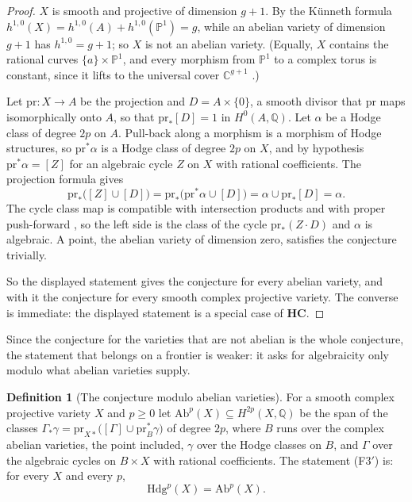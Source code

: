 \documentclass[11pt,reqno]{amsart}
\theoremstyle{plain}
\theoremstyle{definition}
\newtheorem{definition}[theorem]{Definition}
\theoremstyle{remark}
\newcommand{\QQ}{\mathbb{Q}}
\newcommand{\CC}{\mathbb{C}}
\newcommand{\PP}{\mathbb{P}}
\newcommand{\Hdg}{\mathrm{Hdg}}
\begin{document}
\begin{proof}
$X$ is smooth and projective of dimension $g+1$. By the K\"unneth formula
$h^{1,0}(X)=h^{1,0}(A)+h^{1,0}(\PP^{1})=g$, while an abelian variety of
dimension $g+1$ has $h^{1,0}=g+1$; so $X$ is not an abelian variety. (Equally,
$X$ contains the rational curves $\{a\}\times\PP^{1}$, and every morphism
from $\PP^{1}$ to a complex torus is constant, since it lifts to the
universal cover $\CC^{g+1}$ \cite[Chapter~1]{BL04}.)

Let $\mathrm{pr}\colon X\to A$ be the projection and $D=A\times\{0\}$, a
smooth divisor that $\mathrm{pr}$ maps isomorphically onto $A$, so that
$\mathrm{pr}_{*}[D]=1$ in $H^{0}(A,\QQ)$. Let $\alpha$ be a Hodge class of
degree $2p$ on $A$. Pull-back along a morphism is a morphism of Hodge
structures, so $\mathrm{pr}^{*}\alpha$ is a Hodge class of degree $2p$ on
$X$, and by hypothesis $\mathrm{pr}^{*}\alpha=[Z]$ for an algebraic cycle
$Z$ on $X$ with rational coefficients. The projection formula gives
\[
  \mathrm{pr}_{*}\bigl([Z]\cup[D]\bigr)
  =\mathrm{pr}_{*}\bigl(\mathrm{pr}^{*}\alpha\cup[D]\bigr)
  =\alpha\cup\mathrm{pr}_{*}[D]=\alpha .
\]
The cycle class map is compatible with intersection products and with proper
push-forward \cite[Chapter~19]{Ful98}, so the left side
is the class of the cycle $\mathrm{pr}_{*}(Z\cdot D)$ and $\alpha$ is
algebraic. A point, the abelian variety of dimension zero, satisfies the
conjecture trivially.

So the displayed statement gives the conjecture for every abelian variety,
and with it the conjecture for every smooth complex projective variety. The
converse is immediate: the displayed statement is a special case of
$\mathbf{HC}$.
\end{proof}

Since the conjecture for the varieties that are not abelian is the whole
conjecture, the statement that belongs on a frontier is weaker: it asks for
algebraicity only modulo what abelian varieties supply.

\begin{definition}[The conjecture modulo abelian varieties]
\label{def:f3prime}
For a smooth complex projective variety $X$ and $p\ge0$ let
$\mathrm{Ab}^{p}(X)\subseteq H^{2p}(X,\QQ)$ be the span of the classes
$\Gamma_{*}\gamma=\mathrm{pr}_{X*}\bigl([\Gamma]\cup\mathrm{pr}_{B}^{*}\gamma\bigr)$
of degree $2p$, where $B$ runs over the complex abelian varieties, the point
included, $\gamma$ over the Hodge classes on $B$, and $\Gamma$ over the
algebraic cycles on $B\times X$ with rational coefficients. The statement
\textup{(F3$'$)} is: for every $X$ and every $p$,
\[
  \Hdg^{p}(X)=\mathrm{Ab}^{p}(X).
\]
\end{definition}
\end{document}
